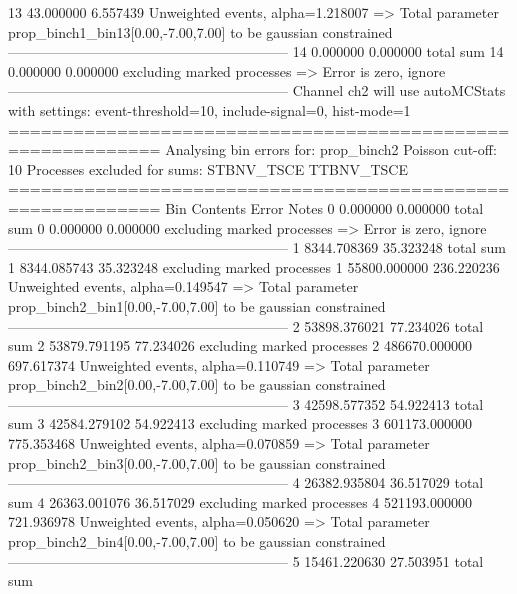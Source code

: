 13         43.000000       6.557439        Unweighted events, alpha=1.218007
  => Total parameter prop_binch1_bin13[0.00,-7.00,7.00] to be gaussian constrained
------------------------------------------------------------
14         0.000000        0.000000        total sum                     
14         0.000000        0.000000        excluding marked processes    
  => Error is zero, ignore      
------------------------------------------------------------
Channel ch2 will use autoMCStats with settings: event-threshold=10, include-signal=0, hist-mode=1
============================================================
Analysing bin errors for: prop_binch2
Poisson cut-off: 10
Processes excluded for sums: STBNV_TSCE TTBNV_TSCE
============================================================
Bin        Contents        Error           Notes                         
0          0.000000        0.000000        total sum                     
0          0.000000        0.000000        excluding marked processes    
  => Error is zero, ignore      
------------------------------------------------------------
1          8344.708369     35.323248       total sum                     
1          8344.085743     35.323248       excluding marked processes    
1          55800.000000    236.220236      Unweighted events, alpha=0.149547
  => Total parameter prop_binch2_bin1[0.00,-7.00,7.00] to be gaussian constrained
------------------------------------------------------------
2          53898.376021    77.234026       total sum                     
2          53879.791195    77.234026       excluding marked processes    
2          486670.000000   697.617374      Unweighted events, alpha=0.110749
  => Total parameter prop_binch2_bin2[0.00,-7.00,7.00] to be gaussian constrained
------------------------------------------------------------
3          42598.577352    54.922413       total sum                     
3          42584.279102    54.922413       excluding marked processes    
3          601173.000000   775.353468      Unweighted events, alpha=0.070859
  => Total parameter prop_binch2_bin3[0.00,-7.00,7.00] to be gaussian constrained
------------------------------------------------------------
4          26382.935804    36.517029       total sum                     
4          26363.001076    36.517029       excluding marked processes    
4          521193.000000   721.936978      Unweighted events, alpha=0.050620
  => Total parameter prop_binch2_bin4[0.00,-7.00,7.00] to be gaussian constrained
------------------------------------------------------------
5          15461.220630    27.503951       total sum                     
